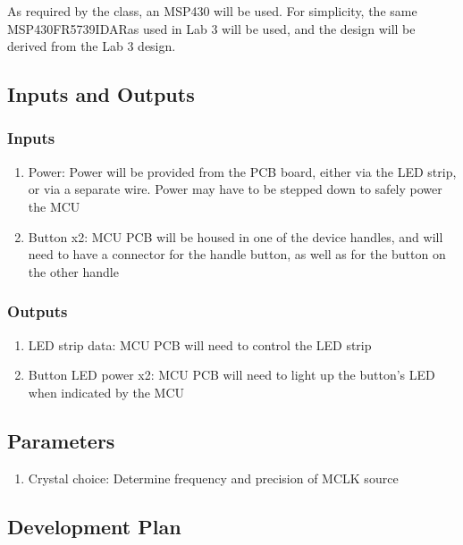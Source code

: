 \documentclass{notes}
\begin{document}
As required by the class, an MSP430 will be used.
For simplicity, the same MSP430FR5739IDAR\footnotemark as used in Lab 3 will be used, and the design will be derived from the Lab 3 design.

\subsection{Inputs and Outputs}

\subsubsection{Inputs}

\begin{enumerate}
    \item Power: Power will be provided from the PCB board, either via the LED strip, or via a separate wire. Power may have to be stepped down to safely power the MCU
    \item Button x2: MCU PCB will be housed in one of the device handles, and will need to have a connector for the handle button, as well as for the button on the other handle
\end{enumerate}

\subsubsection{Outputs}

\begin{enumerate}
    \item LED strip data: MCU PCB will need to control the LED strip
    \item Button LED power x2: MCU PCB will need to light up the button's LED when indicated by the MCU
\end{enumerate}

\subsection{Parameters}

\begin{enumerate}
    \item Crystal choice: Determine frequency and precision of MCLK source
\end{enumerate}

\subsection{Development Plan}
\end{document}
